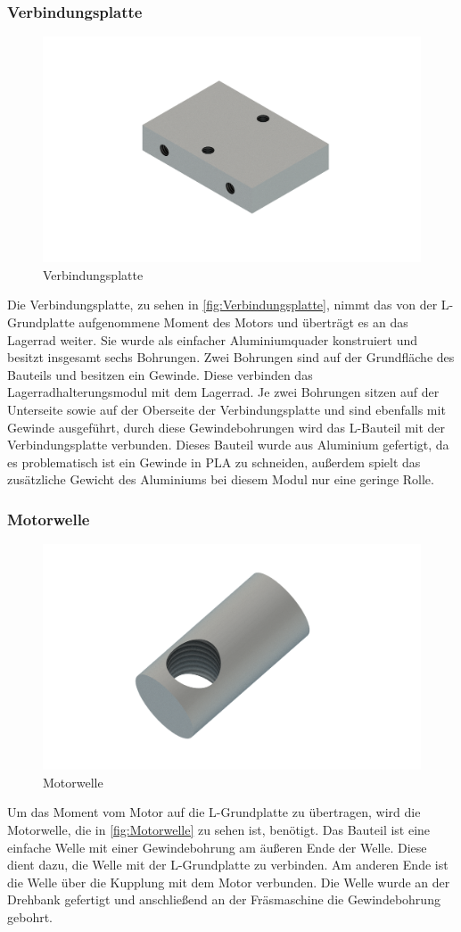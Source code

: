 \subsubsection{Verbindungsplatte}
\begin{figure}
    \includegraphics[width=8 cm]{fig/mech/Verbindungsplatte}
    \caption{Verbindungsplatte}
    \label{fig:Verbindungsplatte}
\end{figure}
Die Verbindungsplatte, zu sehen in \autoref{fig:Verbindungsplatte}, nimmt das von der L-Grundplatte aufgenommene Moment des Motors und überträgt es an das Lagerrad weiter.
Sie wurde als einfacher Aluminiumquader konstruiert und besitzt insgesamt sechs Bohrungen.
Zwei Bohrungen sind auf der Grundfläche des Bauteils und besitzen ein Gewinde.
Diese verbinden das Lagerradhalterungsmodul mit dem Lagerrad.
Je zwei Bohrungen sitzen auf der Unterseite sowie auf der Oberseite der Verbindungsplatte und sind ebenfalls mit Gewinde
ausgeführt, durch diese Gewindebohrungen wird das L-Bauteil mit der Verbindungsplatte verbunden.
Dieses Bauteil wurde aus Aluminium gefertigt, da es problematisch ist ein Gewinde in PLA zu schneiden, außerdem spielt
das zusätzliche Gewicht des Aluminiums bei diesem Modul nur eine geringe Rolle.

\subsubsection{Motorwelle}
\begin{figure}
    \includegraphics[width=8 cm]{fig/mech/Motorwelle.png}
    \caption{Motorwelle}
    \label{fig:Motorwelle}
\end{figure}
Um das Moment vom Motor auf die L-Grundplatte zu übertragen, wird die Motorwelle, die in \autoref{fig:Motorwelle} zu sehen ist, benötigt.
Das Bauteil ist eine einfache Welle mit einer Gewindebohrung am äußeren Ende der Welle.
Diese dient dazu, die Welle mit der L-Grundplatte zu verbinden.
Am anderen Ende ist die Welle über die Kupplung mit dem Motor verbunden.
Die Welle wurde an der Drehbank gefertigt und anschließend an der Fräsmaschine die Gewindebohrung gebohrt.

